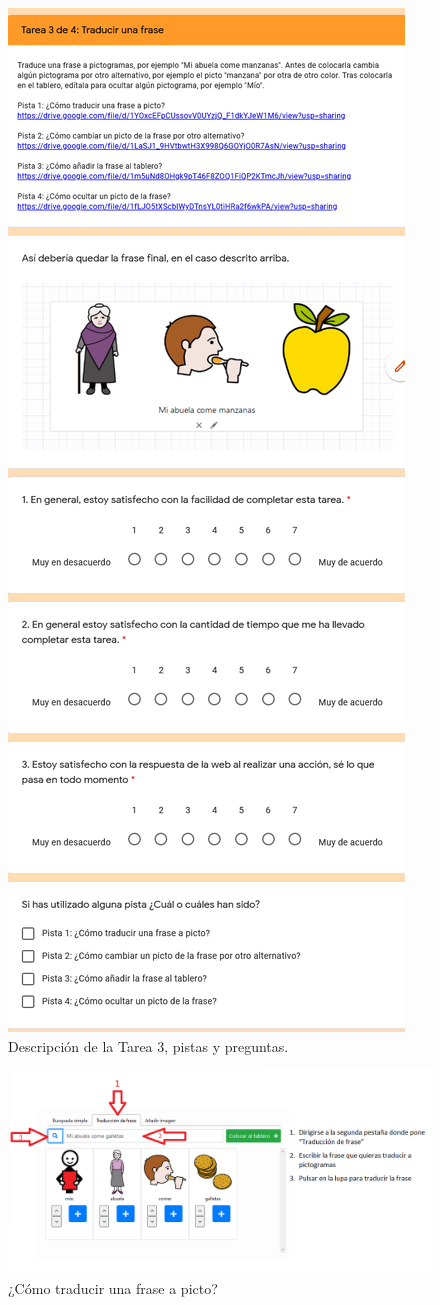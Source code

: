 \begin{figure}[h!]
	\centering
	\includegraphics[width=0.6\linewidth]{Imagenes/Bitmap/Tarea3Preguntas}
	\caption{Descripción de la Tarea 3, pistas y preguntas.}
	\label{fig:tarea3preguntas}
\end{figure}

\begin{figure}[h!]
	\centering
	\includegraphics[width=0.7\linewidth]{Imagenes/Bitmap/Tarea3-Pista1}
	\caption{¿Cómo traducir una frase a picto?}
	\label{fig:tarea3-pista1}
\end{figure}


